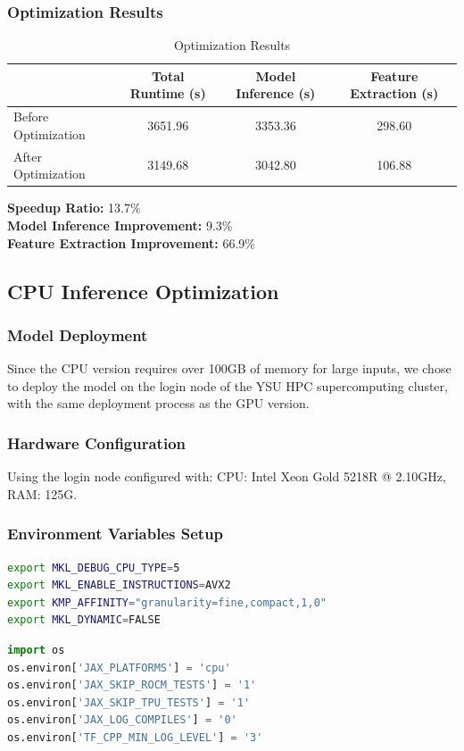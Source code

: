 \documentclass[a4paper,12pt]{article}
\begin{document}


\subsubsection{Optimization Results}

\begin{table}[H]
\centering
\caption{Optimization Results}
\vspace{0.5cm}
\begin{tabular}{lccc}
\toprule
 & Total Runtime (s) & Model Inference (s) & Feature Extraction (s) \\
\midrule
Before Optimization & 3651.96 & 3353.36 & 298.60 \\
After Optimization & 3149.68 & 3042.80 & 106.88 \\
\bottomrule
\end{tabular}
\end{table}

\textbf{Speedup Ratio:} 13.7\% \\
\textbf{Model Inference Improvement:} 9.3\% \\
\textbf{Feature Extraction Improvement:} 66.9\%

\subsection{CPU Inference Optimization}

\subsubsection{Model Deployment}
Since the CPU version requires over 100GB of memory for large inputs, we chose to deploy the model on the login node of the YSU HPC supercomputing cluster, with the same deployment process as the GPU version.

\subsubsection{Hardware Configuration}
Using the login node configured with: CPU: Intel Xeon Gold 5218R @ 2.10GHz, RAM: 125G.

\subsubsection{Environment Variables Setup}
\begin{lstlisting}[language=bash]
export MKL_DEBUG_CPU_TYPE=5
export MKL_ENABLE_INSTRUCTIONS=AVX2
export KMP_AFFINITY="granularity=fine,compact,1,0"
export MKL_DYNAMIC=FALSE
\end{lstlisting}
\begin{lstlisting}[language=python]
import os
os.environ['JAX_PLATFORMS'] = 'cpu'
os.environ['JAX_SKIP_ROCM_TESTS'] = '1'
os.environ['JAX_SKIP_TPU_TESTS'] = '1'
os.environ['JAX_LOG_COMPILES'] = '0'
os.environ['TF_CPP_MIN_LOG_LEVEL'] = '3'
\end{lstlisting}
\end{document}
